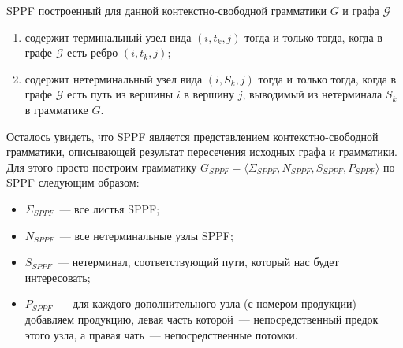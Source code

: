     SPPF построенный для данной контекстно-свободной грамматики $G$ и графа $\mathcal{G}$
    \begin{enumerate}
      \item содержит терминальный узел вида $(i,t_k,j)$ тогда и только тогда, когда в графе $\mathcal{G}$ есть ребро $(i,t_k,j)$;
      \item содержит нетерминальный узел вида $(i,S_k,j)$ тогда и только тогда, когда в графе $\mathcal{G}$ есть путь из вершины $i$ в вершину $j$, выводимый из нетерминала $S_k$ в грамматике $G$.
    \end{enumerate}

    Осталось увидеть, что SPPF является представлением контекстно-свободной грамматики, описывающей результат пересечения исходных графа и грамматики. Для этого просто построим грамматику $G_{\textit{SPPF}} = \langle \Sigma_{\textit{SPPF}}, N_{\textit{SPPF}}, S_{\textit{SPPF}}, P_{\textit{SPPF}}\rangle$ по SPPF следующим образом:
    \begin{itemize}
      \item $\Sigma_{\textit{SPPF}}$~--- все листья SPPF;
      \item $N_{\textit{SPPF}}$~--- все нетерминальные узлы SPPF;
      \item $S_{\textit{SPPF}}$~--- нетерминал, соответствующий пути, который нас будет интересовать;
      \item $P_{\textit{SPPF}}$~--- для каждого дополнительного узла (с номером продукции) добавляем продукцию, левая часть которой~--- непосредственный предок этого узла, а правая чать~--- непосредственные потомки.
    \end{itemize}


